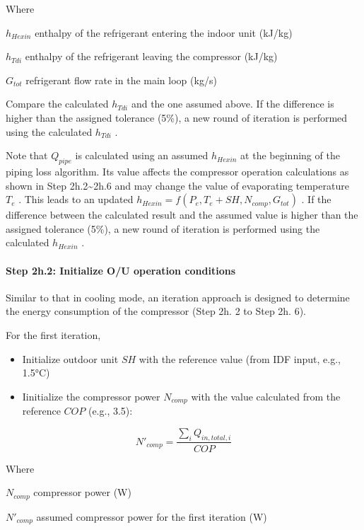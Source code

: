 Where

\(h_{Hexin}\) enthalpy of the refrigerant entering the indoor unit (kJ/kg)

\(h_{Tdi}\) enthalpy of the refrigerant leaving the compressor (kJ/kg)

\(G_{tot}\) refrigerant flow rate in the main loop (kg/s)

Compare the calculated \(h_{Tdi}\) and the one assumed above. If the difference is higher than the assigned tolerance (5\%), a new round of iteration is performed using the calculated \(h_{Tdi}\) .

Note that \(Q_{pipe}\) is calculated using an assumed \(h_{Hexin}\) at the beginning of the piping loss algorithm. Its value affects the compressor operation calculations as shown in Step 2h.2\textasciitilde{}2h.6 and may change the value of evaporating temperature \(T_e\) . This leads to an updated \(h_{Hexin} = f(P_e,T_e+SH,N_{comp},G_{tot})\) . If the difference between the calculated result and the assumed value is higher than the assigned tolerance (5\%), a new round of iteration is performed using the calculated \(h_{Hexin}\) .

\paragraph{Step 2h.2: Initialize O/U operation conditions}\label{step-2h.2-initialize-ou-operation-conditions}

Similar to that in cooling mode, an iteration approach is designed to determine the energy consumption of the compressor (Step 2h. 2 to Step 2h. 6).

For the first iteration,

\begin{itemize}
\item
  Initialize outdoor unit \(SH\) with the reference value (from IDF input, e.g., 1.5°C)
\item
  Iinitialize the compressor power \(N_{comp}\) with the value calculated from the reference \(COP\) (e.g., 3.5):
\end{itemize}

\begin{equation}
N'_{comp} = \frac{\sum_iQ_{in,total,i}}{COP}
\end{equation}

Where

\(N_{comp}\) compressor power (W)

\(N'_{comp}\) assumed compressor power for the first iteration (W)


